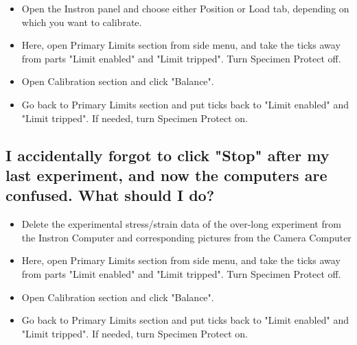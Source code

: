 \documentclass[a4paper]{article}
\begin{document}
\begin{itemize}  
  \item Open the Instron panel and choose either Position or Load tab, depending on which you want to calibrate.
  \item Here, open Primary Limits section from side menu, and take the ticks away from parts "Limit enabled" and "Limit tripped".
  \itme Turn Specimen Protect off.
  \item Open Calibration section and click "Balance".
  \item Go back to Primary Limits section and put ticks back to "Limit enabled" and "Limit tripped". If needed, turn Specimen Protect on.
\end{itemize}

\subsection{I accidentally forgot to click "Stop" after my last experiment, and now the computers are confused. What should I do?}

\begin{itemize}  
   \item Delete the experimental stress/strain data of the over-long experiment from the Instron Computer and corresponding pictures from the Camera Computer
   \item Here, open Primary Limits section from side menu, and take the ticks away from parts "Limit enabled" and "Limit tripped".
   \itme Turn Specimen Protect off.
   \item Open Calibration section and click "Balance".
  \item  Go back to Primary Limits section and put ticks back to "Limit enabled"  and "Limit tripped". If needed, turn Specimen Protect on.
 \end{itemize}
\end{document}
